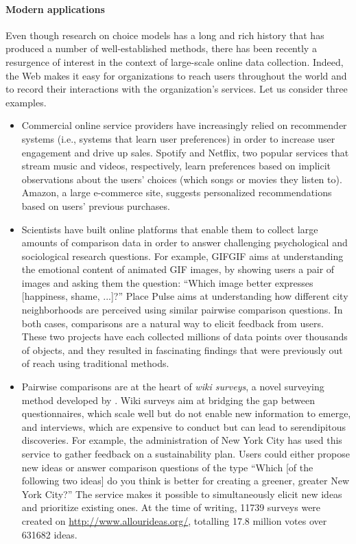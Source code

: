 \paragraph{Modern applications}
Even though research on choice models has a long and rich history that has produced a number of well-established methods, there has been recently a resurgence of interest in the context of large-scale online data collection.
Indeed, the Web makes it easy for organizations to reach users throughout the world and to record their interactions with the organization's services.
Let us consider three examples.
\begin{itemize}
\item Commercial online service providers have increasingly relied on recommender systems (i.e., systems that learn user preferences) in order to increase user engagement and drive up sales.
Spotify and Netflix, two popular services that stream music and videos, respectively, learn preferences based on implicit observations about the users' choices (which songs or movies they listen to).
Amazon, a large e-commerce site, suggests personalized recommendations based on users' previous purchases.

\item Scientists have built online platforms that enable them to collect large amounts of comparison data in order to answer challenging psychological and sociological research questions.
For example, GIFGIF aims at understanding the emotional content of animated GIF images, by showing users a pair of images and asking them the question: ``Which image better expresses [happiness, shame, ...]?''
Place Pulse aims at understanding how different city neighborhoods are perceived using similar pairwise comparison questions.
In both cases, comparisons are a natural way to elicit feedback from users.
These two projects have each collected millions of data points over thousands of objects, and they resulted in fascinating findings that were previously out of reach using traditional methods. 

\item Pairwise comparisons are at the heart of \emph{wiki surveys}, a novel surveying method developed by \citet{salganik2015wiki}.
Wiki surveys aim at bridging the gap between questionnaires, which scale well but do not enable new information to emerge, and interviews, which are expensive to conduct but can lead to serendipitous discoveries.
For example, the administration of New York City has used this service to gather feedback on a sustainability plan.
Users could either propose new ideas or answer comparison questions of the type ``Which [of the following two ideas] do you think is better for creating a greener, greater New York City?''
The service makes it possible to simultaneously elicit new ideas and prioritize existing ones.
At the time of writing, \num{11739} surveys were created on \url{http://www.allourideas.org/}, totalling \num{17.8} million votes over \num{631682} ideas.
\end{itemize}

